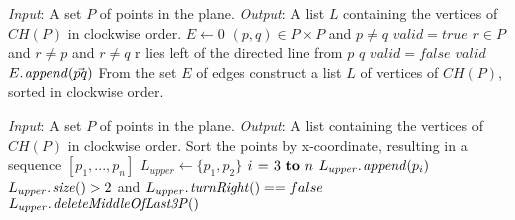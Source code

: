 \documentclass{article}
\begin{document}
	\begin{codebox}
	\li \Comment \textit{Input}: A set $P$ of points in the plane.
	\li \Comment \textit{Output}: A list $L$ containing the vertices of $CH(P)$ in clockwise order.
	\li $E \gets 0$
	\li \For $(p, q) \in P \times P$ and $p \neq q$
	\li \Do $valid = true$
	\li \For $r \in P$ and $r \neq p$ and $r \neq q$
	\li \Do \If r lies left of the directed line from $p$ \To $q$
	\li \Then $valid = false$
	\End \End
	\li \If $valid$ 
	\li \Then $\attrib{E}{append}(\vec{pq})$ 
	\End \End
	\li From the set $E$ of edges construct a list $L$ of 
	vertices of $CH(P)$, sorted in clockwise order.
	\end{codebox}
	
	\begin{codebox}
	\Procname{$\proc{Convex-Hull}(P)$}
	\li \Comment \textit{Input}: A set $P$ of points in the plane.
	\li \Comment \textit{Output}: A list containing the vertices of $CH(P)$ in clockwise order.
	\li Sort the points by x-coordinate, resulting in a sequence $[p_1,...,p_n]$
	\li $L_{upper} \gets \{p_1, p_2\}$
	\li \For $i \gets 3 \To n$
	\li \Do $\attrib{L_{upper}}{append}(p_i)$
	\li \Do \While $\attrib{L_{upper}}{size}() > 2$ and $\attrib{L_{upper}}{turnRight}() == false$
	\li \Do $\attrib{L_{upper}}{deleteMiddleOfLast3P}()$
	\end{codebox}
\end{document}
